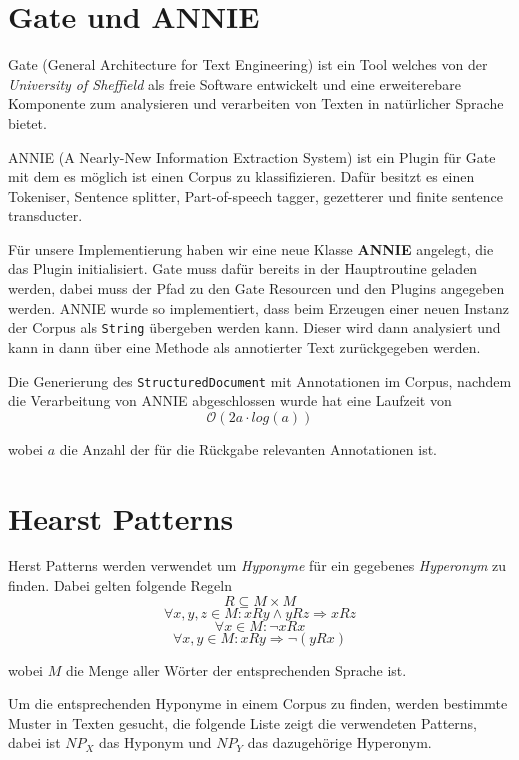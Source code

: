\section{Gate und ANNIE}

Gate (General Architecture for Text Engineering) ist ein Tool welches
von der \textit{University of Sheffield} als freie Software entwickelt
und eine erweiterebare Komponente zum analysieren und verarbeiten von
Texten in natürlicher Sprache bietet.
\cite{Cunningham:2000}

ANNIE (A Nearly-New Information Extraction System) ist ein Plugin für
Gate mit dem es möglich ist einen Corpus zu klassifizieren. Dafür
besitzt es einen Tokeniser, Sentence splitter, Part-of-speech tagger,
gezetterer und finite sentence transducter.
\cite{Cunningham:2002}

Für unsere Implementierung haben wir eine neue Klasse \textbf{ANNIE}
angelegt, die das Plugin initialisiert. Gate muss dafür bereits in der
Hauptroutine geladen werden, dabei muss der Pfad zu den Gate Resourcen
und den Plugins angegeben werden. ANNIE wurde so implementiert, dass
beim Erzeugen einer neuen Instanz der Corpus als \lstinline{String}
übergeben werden kann. Dieser wird dann analysiert und kann in dann
über eine Methode als annotierter Text zurückgegeben werden. 

Die Generierung des \lstinline{StructuredDocument} mit Annotationen im
Corpus, nachdem die Verarbeitung von ANNIE abgeschlossen wurde hat
eine Laufzeit von
$$\mathcal{O}(2a \cdot log(a))$$ %

wobei $a$ die Anzahl der für die Rückgabe relevanten Annotationen ist.


\section{Hearst Patterns}

Herst Patterns werden verwendet um \textit{Hyponyme} für ein gegebenes
\textit{Hyperonym} zu finden. Dabei gelten folgende Regeln
$$R \subseteq M \times M$$
$$\forall x, y, z \in M : xRy \land yRz \Rightarrow xRz$$
$$\forall x \in M : \neg xRx$$
$$\forall x, y \in M : xRy \Rightarrow \neg (yRx)$$

wobei $M$ die Menge aller Wörter der entsprechenden Sprache ist.

Um die entsprechenden Hyponyme in einem Corpus zu finden, werden
bestimmte Muster in Texten gesucht, die folgende Liste zeigt die
verwendeten Patterns, dabei ist $NP_{X}$ das Hyponym und $NP_{Y}$ das
dazugehörige Hyperonym.

